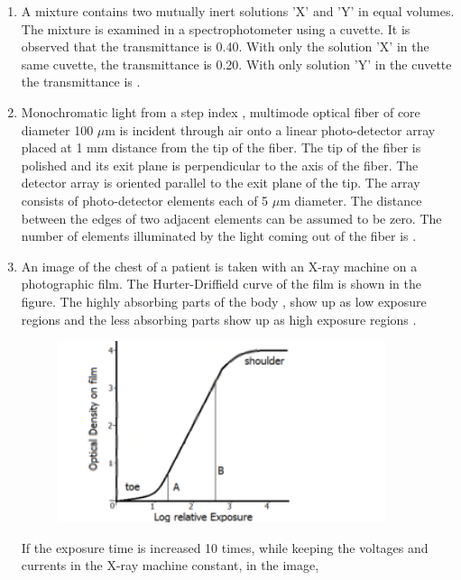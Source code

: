 \documentclass[journal,12pt,onecolumn]{IEEEtran}
\theoremstyle{remark}
\begin{document}
\begin{enumerate}
    \item A mixture contains two mutually inert solutions 'X' and 'Y' in equal volumes. The mixture is examined in a spectrophotometer using a cuvette. It is observed that the transmittance is 0.40. With only the solution 'X' in the same cuvette, the transmittance is 0.20. With only solution 'Y' in the cuvette the transmittance is \underline{\hspace{2cm}}.

    \hfill{}

    
    
    \item Monochromatic light from a step index , multimode optical fiber of core diameter 100 $\mu$m is incident through air  onto a linear photo-detector array placed at 1 mm distance from the tip of the fiber. The tip of the fiber is polished and its exit plane is perpendicular to the axis of the fiber. The detector array is oriented parallel to the exit plane of the tip. The array consists of photo-detector elements each of 5 $\mu$m diameter. The distance between the edges of two adjacent elements can be assumed to be zero. The number of elements illuminated by the light coming out of the fiber is \underline{\hspace{2cm}}.

    \hfill{}

    
    
    \item An image of the chest of a patient is taken with an X-ray machine on a photographic film. The Hurter-Driffield  curve of the film is shown in the figure. The highly absorbing parts of the body , show up as low exposure regions  and the less absorbing parts  show up as high exposure regions .
    \begin{figure}[H]
        \centering
        \includegraphics[width=0.5\columnwidth]{q54}
        \caption*{}
        \label{fig:q54}
    \end{figure}
    If the exposure time is increased 10 times, while keeping the voltages and currents in the X-ray machine constant, in the image,


\end{enumerate}
\end{document}
